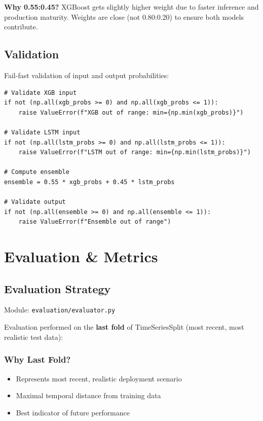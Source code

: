 \documentclass[11pt,a4paper,oneside]{report}
\begin{document}
\textbf{Why 0.55:0.45?} XGBoost gets slightly higher weight due to faster inference and production maturity. Weights are close (not 0.80:0.20) to ensure both models contribute.

\section{Validation}

Fail-fast validation of input and output probabilities:

\begin{lstlisting}
# Validate XGB input
if not (np.all(xgb_probs >= 0) and np.all(xgb_probs <= 1)):
    raise ValueError(f"XGB out of range: min={np.min(xgb_probs)}")

# Validate LSTM input
if not (np.all(lstm_probs >= 0) and np.all(lstm_probs <= 1)):
    raise ValueError(f"LSTM out of range: min={np.min(lstm_probs)}")

# Compute ensemble
ensemble = 0.55 * xgb_probs + 0.45 * lstm_probs

# Validate output
if not (np.all(ensemble >= 0) and np.all(ensemble <= 1)):
    raise ValueError(f"Ensemble out of range")
\end{lstlisting}
\newpage
\chapter{Evaluation \& Metrics}

\section{Evaluation Strategy}

Module: \texttt{evaluation/evaluator.py}

Evaluation performed on the \textbf{last fold} of TimeSeriesSplit (most recent, most realistic test data):

\subsection{Why Last Fold?}

\begin{itemize}
    \item Represents most recent, realistic deployment scenario
    \item Maximal temporal distance from training data
    \item Best indicator of future performance
\end{itemize}
\end{document}
